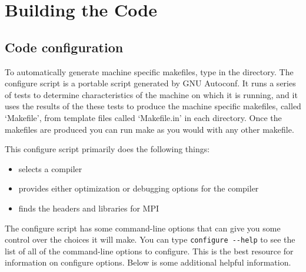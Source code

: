 \chapter{Building the Code}
\section{Code configuration}

To automatically generate machine specific makefiles, type
 in the  directory.  The configure
script is a portable script generated by GNU Autoconf.  It runs a
series of tests to determine characteristics of the machine on which
it is running, and it uses the results of the these tests to produce
the machine specific makefiles, called `Makefile', from template files
called `Makefile.in' in each directory.  Once the makefiles are
produced you can run make as you would with any other makefile.

This configure script primarily does the following things:
\begin{itemize}
\item selects a compiler
\item provides either optimization or debugging options for the compiler
\item finds the headers and libraries for MPI
\end{itemize}

The configure script has some command-line options that can give you
some control over the choices it will make.  You can type
\verb+configure --help+
to see the list of all of the command-line options to configure. This is
the best resource for information on configure options.  Below is some
additional helpful information.


